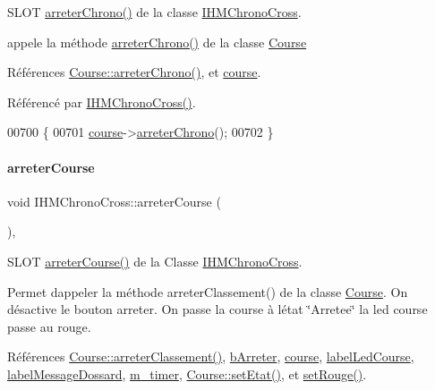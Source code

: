 S\+L\+OT \hyperlink{class_i_h_m_chrono_cross_a8d5c89a4d2ca34252acd8737e29d37fe}{arreter\+Chrono()} de la classe \hyperlink{class_i_h_m_chrono_cross}{I\+H\+M\+Chrono\+Cross}. 

appele la méthode \hyperlink{class_i_h_m_chrono_cross_a8d5c89a4d2ca34252acd8737e29d37fe}{arreter\+Chrono()} de la classe \hyperlink{class_course}{Course} 

Références \hyperlink{class_course_a939635ac8301a7018475cc2ce347375f}{Course\+::arreter\+Chrono()}, et \hyperlink{class_i_h_m_chrono_cross_a03a8226c0e7f423d29302d9a06284ab4}{course}.



Référencé par \hyperlink{class_i_h_m_chrono_cross_a479fc90733fba3e65fb06aa4a3adc02e}{I\+H\+M\+Chrono\+Cross()}.


\begin{DoxyCode}
00700 \{
00701     \hyperlink{class_i_h_m_chrono_cross_a03a8226c0e7f423d29302d9a06284ab4}{course}->\hyperlink{class_course_a939635ac8301a7018475cc2ce347375f}{arreterChrono}();
00702 \}
\end{DoxyCode}
\mbox{\label{class_i_h_m_chrono_cross_ad3d8f287d08dd9aa0c6b10c9973672a4}} 
\paragraph{\texorpdfstring{arreter\+Course}{arreterCourse}}
{\footnotesize\ttfamily void I\+H\+M\+Chrono\+Cross\+::arreter\+Course (\begin{DoxyParamCaption}{ }\end{DoxyParamCaption})\hspace{0.3cm}{\ttfamily [private]}, {\ttfamily [slot]}}



S\+L\+OT \hyperlink{class_i_h_m_chrono_cross_ad3d8f287d08dd9aa0c6b10c9973672a4}{arreter\+Course()} de la Classe \hyperlink{class_i_h_m_chrono_cross}{I\+H\+M\+Chrono\+Cross}. 

Permet d\textquotesingle{}appeler la méthode arreter\+Classement() de la classe \hyperlink{class_course}{Course}. On désactive le bouton arreter. On passe la course à l\textquotesingle{}état \char`\"{}\+Arretee\char`\"{} la led course passe au rouge. 

Références \hyperlink{class_course_a4426310a411d8ecf7f4a2dc64c24a42d}{Course\+::arreter\+Classement()}, \hyperlink{class_i_h_m_chrono_cross_a75ce4fcdab11095834fe3f9e931f8964}{b\+Arreter}, \hyperlink{class_i_h_m_chrono_cross_a03a8226c0e7f423d29302d9a06284ab4}{course}, \hyperlink{class_i_h_m_chrono_cross_a8568c80f2e2ffe96c81d2a94a2146159}{label\+Led\+Course}, \hyperlink{class_i_h_m_chrono_cross_abd23647486d38e6f57aef1faf50757af}{label\+Message\+Dossard}, \hyperlink{class_i_h_m_chrono_cross_ad29ebde513a6e722cf87aa06e767416a}{m\+\_\+timer}, \hyperlink{class_course_a3ebcde1fa443cb20d71fb98af4d0c418}{Course\+::set\+Etat()}, et \hyperlink{class_i_h_m_chrono_cross_a3b46a31326bdde2b5ad67a9f0a6de76b}{set\+Rouge()}.



